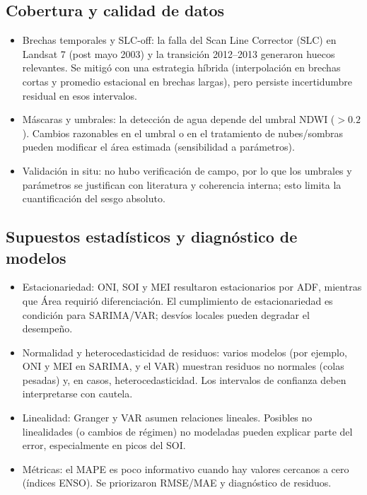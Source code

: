 \subsection{Cobertura y calidad de datos}
\begin{itemize}
    \item Brechas temporales y SLC-off: la falla del Scan Line Corrector (SLC) en Landsat 7 (post mayo 2003) y la transición 2012–2013 generaron huecos relevantes. Se mitigó con una estrategia híbrida (interpolación en brechas cortas y promedio estacional en brechas largas), pero persiste incertidumbre residual en esos intervalos.
    \item Máscaras y umbrales: la detección de agua depende del umbral NDWI ($>0.2$). Cambios razonables en el umbral o en el tratamiento de nubes/sombras pueden modificar el área estimada (sensibilidad a parámetros).
    \item Validación in situ: no hubo verificación de campo, por lo que los umbrales y parámetros se justifican con literatura y coherencia interna; esto limita la cuantificación del sesgo absoluto.
\end{itemize}

\subsection{Supuestos estadísticos y diagnóstico de modelos}
\begin{itemize}
    \item Estacionariedad: ONI, SOI y MEI resultaron estacionarios por ADF, mientras que Área requirió diferenciación. El cumplimiento de estacionariedad es condición para SARIMA/VAR; desvíos locales pueden degradar el desempeño.
    \item Normalidad y heterocedasticidad de residuos: varios modelos (por ejemplo, ONI y MEI en SARIMA, y el VAR) muestran residuos no normales (colas pesadas) y, en casos, heterocedasticidad. Los intervalos de confianza deben interpretarse con cautela.
    \item Linealidad: Granger y VAR asumen relaciones lineales. Posibles no linealidades (o cambios de régimen) no modeladas pueden explicar parte del error, especialmente en picos del SOI.
    \item Métricas: el MAPE es poco informativo cuando hay valores cercanos a cero (índices ENSO). Se priorizaron RMSE/MAE y diagnóstico de residuos.
\end{itemize}

